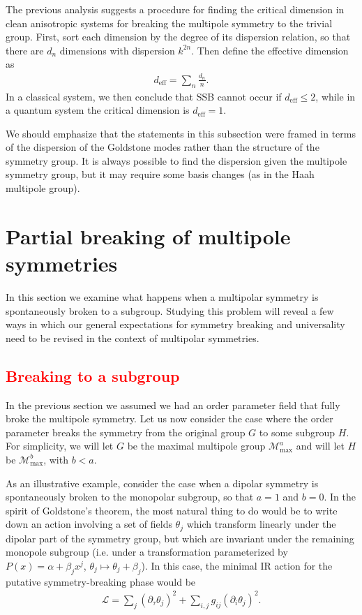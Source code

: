\documentclass[pra,aps,twocolumn, amsfonts,amsmath,amssymb,nofootinbib,superscriptaddress]{revtex4-2}
\newcommand{\note}[1]{\textcolor{red}{#1}}
\newcommand{\eff}{\text{eff}}
\begin{document}
The previous analysis suggests a procedure for finding the critical dimension in clean anisotropic systems for breaking the multipole symmetry to the trivial group. First, sort each dimension by the degree of its dispersion relation, so that there are $d_n$ dimensions with dispersion $k^{2n}$. Then define the effective dimension as 
\begin{align}
d_\eff = \sum_n \frac{d_n}{n}.
\end{align}
In a classical system, we then conclude that SSB cannot occur if $d_\eff\le 2$, while in a quantum system the critical dimension is $d_\eff = 1$.

We should emphasize that the statements in this subsection were framed in terms of the dispersion of the Goldstone modes rather than the structure of the symmetry group. It is always possible to find the dispersion given the multipole symmetry group, but it may require some basis changes (as in the Haah multipole group).

\section{Partial breaking of multipole symmetries} \label{sec:partial}

In this section we examine what happens when a multipolar symmetry is spontaneously broken to a subgroup. Studying this problem will reveal a few ways in which our general expectations for symmetry breaking and universality need to be revised in the context of multipolar symmetries. 

\subsection{\note{Breaking to a subgroup}} \label{sub:subgroup}

In the previous section we assumed we had an order parameter field that fully broke the multipole symmetry. Let us now consider the case where the order parameter breaks the symmetry from the original group $G$ to some subgroup $H$. For simplicity, we will let $G$ be the maximal multipole group $\mathcal{M}^{a}_\text{max}$ and will let $H$ be $\mathcal{M}^b_\text{max}$, with $b<a$. 

As an illustrative example, consider the case when a dipolar symmetry is spontaneously broken to the monopolar subgroup, so that $a=1$ and $b=0$. In the spirit of Goldstone's theorem, the most natural thing to do would be to write down an action involving a set of fields $\theta_j$ which transform linearly under the dipolar part of the symmetry group, but which are invariant under the remaining monopole subgroup (i.e. under a transformation parameterized by $P(x) = \alpha + \beta_j x^j$, $\theta_j \mapsto \theta_j + \beta_j$). In this case, the minimal IR action for the putative symmetry-breaking phase would be 
\begin{align}
    \mathcal{L}= \sum_j  (\partial_\tau \theta_j)^2 + \sum_{i,j} g_{ij} (\partial_i \theta_j)^2.
\end{align}
\end{document}
